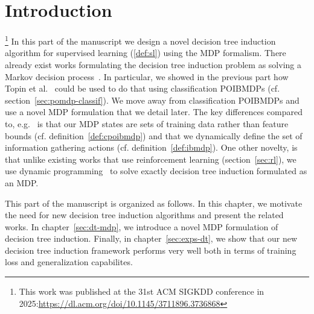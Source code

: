 \chapter{Introduction}\label{sec:part2}\footnote{This work was published at the 31st ACM SIGKDD conference in 2025:\url{https://dl.acm.org/doi/10.1145/3711896.3736868}}
In this part of the manuscript we design a novel decision tree induction algorithm for supervised learning (\ref{def:sl}) using the MDP formalism.
There already exist works formulating the decision tree induction problem as solving a Markov decision process~\cite{Dulac_Arnold_2011,garlapati2015reinforcementlearningapproachonline,topin2021iterative,chaouki2024branchesfastdynamicprogramming}.
In particular, we showed in the previous part how Topin et al.~\cite{topin2021iterative} could be used to do that using classification POIBMDPs (cf. section~\ref{sec:pomdp-classif}).
We move away from classification POIBMDPs and use a novel MDP formulation that we detail later.
The key differences compared to, e.g.~\cite{topin2021iterative} is that our MDP states are sets of training data rather than feature bounds (cf. definition~\ref{def:cpoibmdp}) and that we dynamically define the set of information gathering actions (cf. definition~\ref{def:ibmdp}).
One other novelty, is that unlike existing works that use reinforcement learning (section~\ref{sec:rl}), we use dynamic programming~\cite{Bellman} to solve exactly decision tree induction formulated as an MDP.

This part of the manuscript is organized as follows.
In this chapter, we motivate the need for new decision tree induction algorithms and present the related works.
In chapter~\ref{sec:dt-mdp}, we introduce a novel MDP formulation of decision tree induction.
Finally, in chapter~\ref{sec:exps-dt}, we show that our new decision tree induction framework performs very well both in terms of training loss and generalization capabilites.

